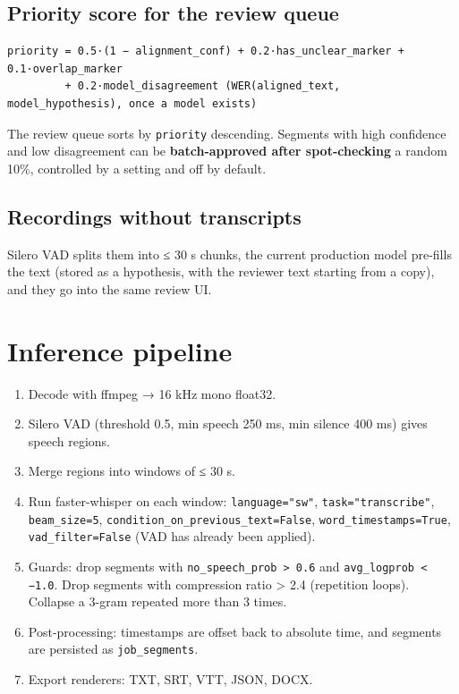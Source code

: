 \documentclass[11pt]{article}
\begin{document}
\hypertarget{priority-score-for-the-review-queue}{%
\subsection{Priority score for the review queue}\label{priority-score-for-the-review-queue}}

\begin{lstlisting}
priority = 0.5·(1 − alignment_conf) + 0.2·has_unclear_marker + 0.1·overlap_marker
         + 0.2·model_disagreement (WER(aligned_text, model_hypothesis), once a model exists)
\end{lstlisting}

The review queue sorts by \texttt{priority} descending. Segments with high confidence and low disagreement can be \textbf{batch-approved after spot-checking} a random 10\%, controlled by a setting and off by default.

\hypertarget{recordings-without-transcripts}{%
\subsection{Recordings without transcripts}\label{recordings-without-transcripts}}

Silero VAD splits them into ≤ 30 s chunks, the current production model pre-fills the text (stored as a hypothesis, with the reviewer text starting from a copy), and they go into the same review UI.

\hypertarget{inference-pipeline}{%
\section{Inference pipeline}\label{inference-pipeline}}

\begin{enumerate}
\def\labelenumi{\arabic{enumi}.}
\tightlist
\item
  Decode with ffmpeg → 16 kHz mono float32.
\item
  Silero VAD (threshold 0.5, min speech 250 ms, min silence 400 ms) gives speech regions.
\item
  Merge regions into windows of ≤ 30 s.
\item
  Run faster-whisper on each window: \texttt{language=\allowbreak{}"sw"}, \texttt{task=\allowbreak{}"transcribe"}, \texttt{beam\_\allowbreak{}size=\allowbreak{}5}, \texttt{condition\_\allowbreak{}on\_\allowbreak{}previous\_\allowbreak{}text=\allowbreak{}False}, \texttt{word\_\allowbreak{}timestamps=\allowbreak{}True}, \texttt{vad\_\allowbreak{}filter=\allowbreak{}False} (VAD has already been applied).
\item
  Guards: drop segments with \texttt{no\_\allowbreak{}speech\_\allowbreak{}prob > 0.\allowbreak{}6} and \texttt{avg\_\allowbreak{}logprob < −1.\allowbreak{}0}. Drop segments with compression ratio \textgreater{} 2.4 (repetition loops). Collapse a 3-gram repeated more than 3 times.
\item
  Post-processing: timestamps are offset back to absolute time, and segments are persisted as \texttt{job\_\allowbreak{}segments}.
\item
  Export renderers: TXT, SRT, VTT, JSON, DOCX.
\end{enumerate}
\end{document}
